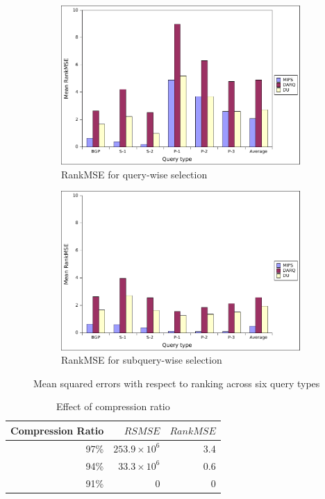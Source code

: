 \documentclass{sig-alternate}  %
\begin{document}
\begin{figure}
\centering				
\begin{subfigure}[b]{0.45\textwidth}
                \centering
\includegraphics[width=\textwidth]{img/querywise_ranking}
                \caption{RankMSE for query-wise selection}
                \label{fig:rankQuery}
        \end{subfigure}			
				\begin{subfigure}[b]{0.45\textwidth}
                \centering
\includegraphics[width=\textwidth]{img/subquerywise_ranking}
                \caption{RankMSE for subquery-wise selection}
                \label{fig:rankSubquery}
        \end{subfigure}
\caption{Mean squared errors with respect to ranking across six query types}
\label{fig:rank}
\end{figure}


\begin{table}
\centering
\begin{tabular}{rrr}
\hline
Compression Ratio		& $RSMSE$	& $RankMSE$ \\\hline
97\%	& $253.9 \times 10^6$	& 3.4 \\
94\%	& $33.3 \times 10^6$	& 0.6 \\
91\%	& 0					&	0 \\\hline
\end{tabular}
\caption{Effect of compression ratio}
\label{tab:compression}
\end{table}
\end{document}
